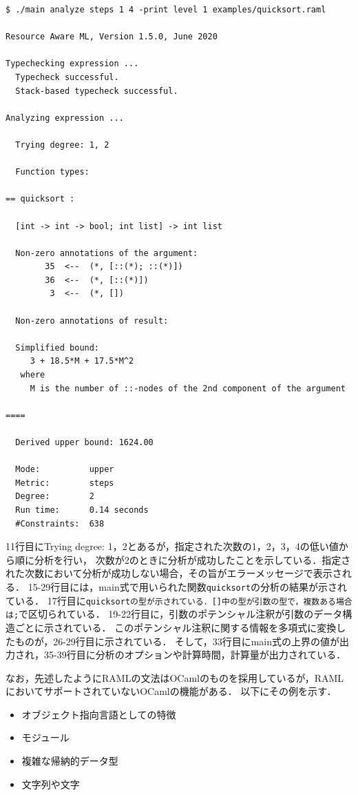 \documentclass{kuisthesis}
\begin{document}
\begin{lstlisting}[basicstyle={\ttfamily\color{base}\scriptsize}]
$ ./main analyze steps 1 4 -print level 1 examples/quicksort.raml

Resource Aware ML, Version 1.5.0, June 2020

Typechecking expression ...
  Typecheck successful.
  Stack-based typecheck successful.

Analyzing expression ...

  Trying degree: 1, 2

  Function types:

== quicksort :

  [int -> int -> bool; int list] -> int list

  Non-zero annotations of the argument:
        35  <--  (*, [::(*); ::(*)])
        36  <--  (*, [::(*)])
         3  <--  (*, [])

  Non-zero annotations of result:

  Simplified bound:
     3 + 18.5*M + 17.5*M^2
   where
     M is the number of ::-nodes of the 2nd component of the argument

====

  Derived upper bound: 1624.00

  Mode:          upper
  Metric:        steps
  Degree:        2
  Run time:      0.14 seconds
  #Constraints:  638
\end{lstlisting}

11行目にTrying degree: 1，2とあるが，指定された次数の1，2，3，4の低い値から順に分析を行い，
次数が2のときに分析が成功したことを示している．指定された次数において分析が成功しない場合，その旨がエラーメッセージで表示される．
15-29行目には，main式で用いられた関数{\tt quicksort}の分析の結果が示されている．
17行目に{\tt quicksortの型が示されている．[]中の型が引数の型で，複数ある場合は;}で区切られている．
19-22行目に，引数のポテンシャル注釈が引数のデータ構造ごとに示されている．
このポテンシャル注釈に関する情報を多項式に変換したものが，26-29行目に示されている．
そして，33行目にmain式の上界の値が出力され，35-39行目に分析のオプションや計算時間，計算量が出力されている．

なお，先述したようにRAMLの文法はOCamlのものを採用しているが，RAMLにおいてサポートされていないOCamlの機能がある．
以下にその例を示す．
\begin{itemize}
  \item オブジェクト指向言語としての特徴
  \item モジュール
  \item 複雑な帰納的データ型
  \item 文字列や文字
\end{itemize}
\end{document}
